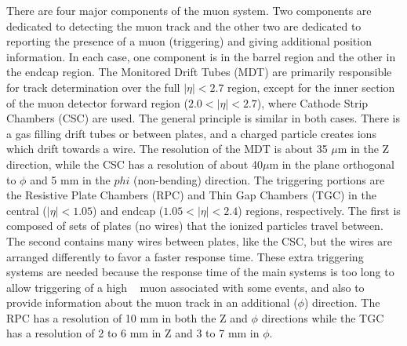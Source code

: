 There are four major components of the muon system.  Two components are dedicated to detecting the muon track and the other two are dedicated to reporting the presence of a muon (triggering) and giving additional position information.  In each case, one component is in the barrel region and the other in the endcap region.  The Monitored Drift Tubes (MDT) are primarily responsible for track determination over the full $|\eta| < 2.7$ region, except for the inner section of the muon detector forward region ($2.0 < |\eta| < 2.7$), where Cathode Strip Chambers (CSC) are used.  The general principle is similar in both cases.  There is a gas filling drift tubes or between plates, and a charged particle creates ions which drift towards a wire.  The resolution of the MDT is about 35 $\mu$m in the Z direction, while the CSC has a resolution of about 40$\mu$m in the plane orthogonal to $\phi$ and 5 mm in the $phi$ (non-bending) direction.  The triggering portions are the Resistive Plate Chambers (RPC) and Thin Gap Chambers (TGC) in the central ($|\eta| < 1.05$) and endcap ($1.05 < |\eta| < 2.4$) regions, respectively.  The first is composed of sets of plates (no wires) that the ionized particles travel between.  The second contains many wires between plates, like the CSC, but the wires are arranged differently to favor a faster response time.  These extra triggering systems are needed because the response time of the main systems is too long to allow triggering of a high \pt~ muon associated with some events, and also to provide information about the muon track in an additional ($\phi$) direction.  The RPC has a resolution of 10 mm in both the Z and $\phi$ directions while the TGC has a resolution of 2 to 6 mm in Z and 3 to 7 mm in $\phi$.

